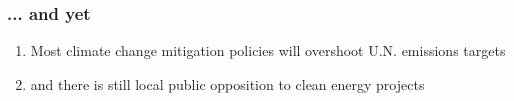 
        






\begin{frame}
    \frametitle{... and yet}

    \begin{enumerate}
        \item Most climate change mitigation policies will overshoot U.N.
        emissions targets \cite{roelfsema_taking_2020}
        \item and there is still local public opposition to clean energy
        projects 
        \cite{aitken_why_2010,firestone_public_2012,stokes_prevalence_2023}
    \end{enumerate}

\end{frame}

